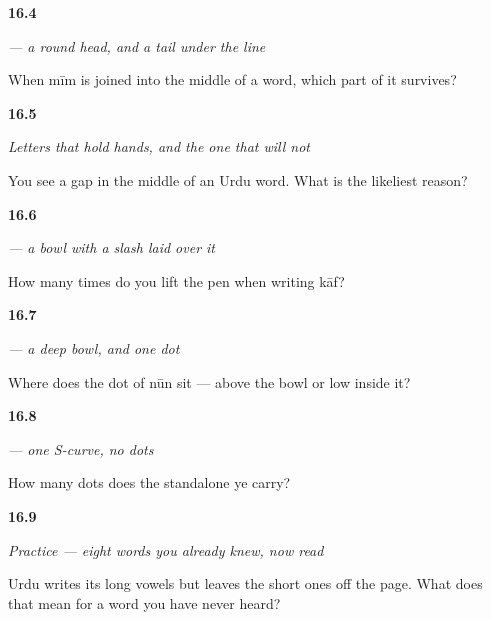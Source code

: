 \noindent\begin{minipage}[t]{\linewidth}
\raggedright
\hypertarget{review-UR-W16-mim-head}{\textbf{16.4}} \emph{ — a round head, and a tail under the line}\par
\small When mīm is joined into the middle of a word, which part of it survives?
\end{minipage}\par\medskip

\noindent\begin{minipage}[t]{\linewidth}
\raggedright
\hypertarget{review-UR-W16-joining-gap}{\textbf{16.5}} \emph{Letters that hold hands, and the one that will not}\par
\small You see a gap in the middle of an Urdu word. What is the likeliest reason?
\end{minipage}\par\medskip

\noindent\begin{minipage}[t]{\linewidth}
\raggedright
\hypertarget{review-UR-W16-kaf-lifts}{\textbf{16.6}} \emph{ — a bowl with a slash laid over it}\par
\small How many times do you lift the pen when writing kāf?
\end{minipage}\par\medskip

\noindent\begin{minipage}[t]{\linewidth}
\raggedright
\hypertarget{review-UR-W16-nun-dot}{\textbf{16.7}} \emph{ — a deep bowl, and one dot}\par
\small Where does the dot of nūn sit — above the bowl or low inside it?
\end{minipage}\par\medskip

\noindent\begin{minipage}[t]{\linewidth}
\raggedright
\hypertarget{review-UR-W16-ye-dots}{\textbf{16.8}} \emph{ — one S-curve, no dots}\par
\small How many dots does the standalone ye carry?
\end{minipage}\par\medskip

\noindent\begin{minipage}[t]{\linewidth}
\raggedright
\hypertarget{review-UR-C16-practice-vowels}{\textbf{16.9}} \emph{Practice — eight words you already knew, now read}\par
\small Urdu writes its long vowels but leaves the short ones off the page. What does that mean for a word you have never heard?
\end{minipage}\par\medskip

